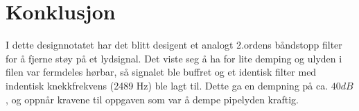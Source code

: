 
\section{Konklusjon}
\label{konklusjon}

I dette designnotatet har det blitt desigent et analogt 2.ordens båndstopp filter for å fjerne støy på et lydsignal. Det viste seg å ha for lite demping og ulyden i filen var fermdeles hørbar, så signalet ble buffret og et identisk filter med indentisk knekkfrekvens (2489 Hz) ble lagt til. Dette ga en dempning på ca. $40dB$, og oppnår kravene til oppgaven som var å dempe pipelyden kraftig.
